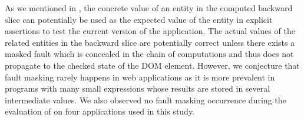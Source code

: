  As we mentioned in , the concrete value of an entity in the computed backward slice can potentially be used as the expected value of the entity in explicit assertions to test the current version of the application.
The actual values of the related entities in the backward slice are potentially correct unless there exists a masked fault which is concealed in the chain of computations and thus does not propagate to the checked state of the DOM element. However, we conjecture that fault masking rarely happens in \javascript web applications as it is more prevalent in programs with many small expressions whose results are stored in several intermediate values. We also observed no fault masking occurrence during the evaluation of \tool on four \javascript applications used in this study.